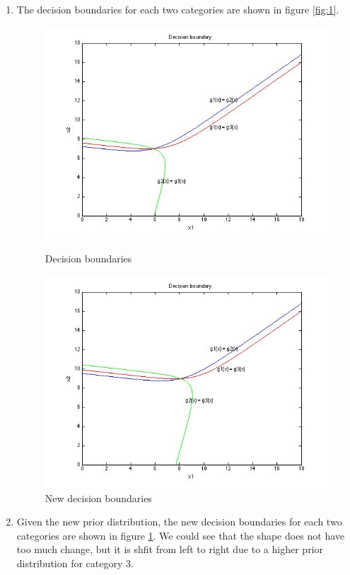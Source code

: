 \documentclass[paper=a4, fontsize=11pt]{scrartcl} %
\numberwithin{equation}{section} %
\numberwithin{figure}{section} %
\numberwithin{table}{section} %
\begin{document}
\begin{enumerate}
\item The decision boundaries for each two categories are shown in figure \ref{fig:1}.
\begin{figure}[htbp]
	\centering
		\includegraphics[width = 5in]{figure1.jpg}
		\caption{Decision boundaries}
		\label{fig:1}
		
		\includegraphics[width = 5in]{figure2.jpg}
		\caption{New decision boundaries}
		\label{fig:2}
\end{figure}

\item Given the new prior distribution, the new decision boundaries for each two categories are shown in figure \ref{fig:2}. We could see that the shape does not have too much change, but it is shfit from left to right due to a higher prior distribution for category 3.
\end{enumerate}
\end{document}
